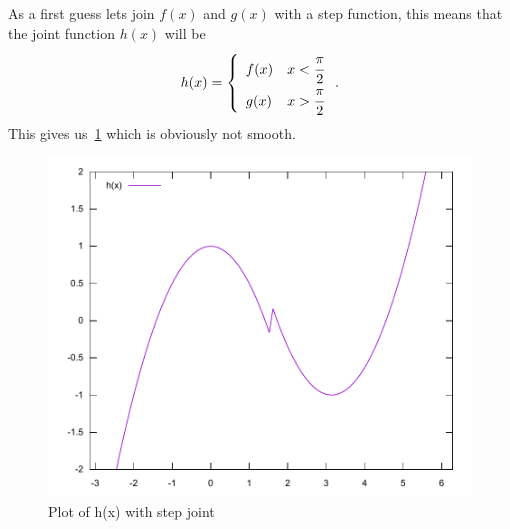 \documentclass[11pt,DIV=10,final]{scrreprt} %
\begin{document}
As a first guess lets join $f(x)$ and $g(x)$ with a step function, this means that the joint function $h(x)$ will be
\[
  h(x) =  \left\{
    \begin{array}{ll}
           f(x) & x < \cfrac{\pi}{2} \\
           g(x) & x > \cfrac{\pi}{2}
    \end{array}
    \right..
\]
This gives us~\ref{fig:joint-step} which is obviously not smooth.
\begin{figure}[H]\label{fig:joint-step}
  \centering
  \includegraphics[width=.9\textwidth]{plots/step_joint.pdf}
  \caption{Plot of h(x) with step joint}
\end{figure}
\end{document}
